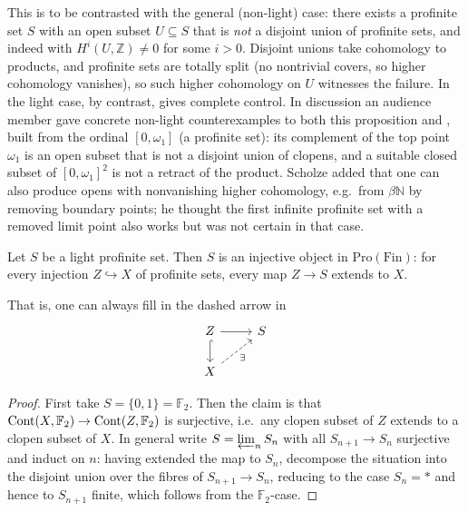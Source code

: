 \begin{remark}
\label{rmk:2:general-open-wild}
This is to be contrasted with the general (non-light) case: there exists a
profinite set $S$ with an open subset $U\subseteq S$ that is \emph{not} a disjoint
union of profinite sets, and indeed with $H^i(U,\mathbb{Z})\neq 0$ for some
$i>0$. Disjoint unions take cohomology to products, and profinite sets are
totally split (no nontrivial covers, so higher cohomology vanishes), so such
higher cohomology on $U$ witnesses the failure. In the light case, by contrast,
 gives complete control. In discussion an audience
member gave concrete non-light counterexamples to both this proposition and
, built from the ordinal $[0,\omega_1]$ (a profinite set):
its complement of the top point $\omega_1$ is an open subset that is not a
disjoint union of clopens, and a suitable closed subset of $[0,\omega_1]^2$ is
not a retract of the product. Scholze added that one can also produce opens with
nonvanishing higher cohomology, e.g.\ from $\beta\mathbb{N}$ by removing boundary
points; he thought the first infinite profinite set with a removed limit point
also works but was not certain in that case.
\end{remark}

\begin{proposition}[Injectivity]
\label{prop:2:injective}
Let $S$ be a light profinite set. Then $S$ is an injective object in
$\mathrm{Pro}(\mathrm{Fin})$: for every injection $Z\hookrightarrow X$ of
profinite sets, every map $Z\to S$ extends to $X$.
\end{proposition}

That is, one can always fill in the dashed arrow in
\[
\begin{tikzcd}
Z \arrow[r] \arrow[d, hook] & S \\
X \arrow[ur, dashed, "\exists"']
\end{tikzcd}
\]

\begin{proof}
First take $S=\{0,1\}=\mathbb{F}_2$. Then the claim is that
$\operatorname{Cont}(X,\mathbb{F}_2)\to\operatorname{Cont}(Z,\mathbb{F}_2)$ is surjective, i.e.\ any clopen
subset of $Z$ extends to a clopen subset of $X$. In general write
$S=\varprojlim_n S_n$ with all $S_{n+1}\to S_n$ surjective and induct on $n$:
having extended the map to $S_n$, decompose the situation into the disjoint union
over the fibres of $S_{n+1}\to S_n$, reducing to the case $S_n=\ast$ and hence to
$S_{n+1}$ finite, which follows from the $\mathbb{F}_2$-case.
\end{proof}

